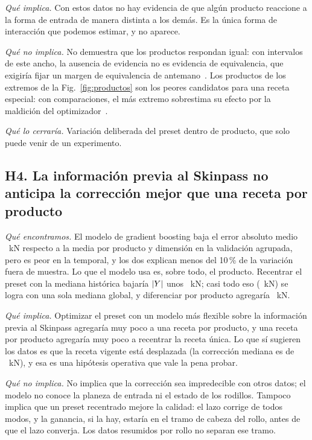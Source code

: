 \emph{Qué implica.} Con estos datos no hay evidencia de que algún producto reaccione a la forma de entrada de manera
distinta a los demás. Es la única forma de interacción que podemos estimar, y no aparece.

\emph{Qué no implica.} No demuestra que los productos respondan igual: con intervalos de este ancho, la ausencia de
evidencia no es evidencia de equivalencia, que exigiría fijar un margen de equivalencia de antemano~\cite{wellek2010}.
Los productos de los extremos de la Fig.~\ref{fig:productos} son los peores candidatos para una receta especial: con
\NProdHet{} comparaciones, el más extremo sobrestima su efecto por la maldición del optimizador~\cite{smith2006}.

\emph{Qué lo cerraría.} Variación deliberada del preset dentro de producto, que solo puede venir de un experimento.

\subsection{H4. La información previa al Skinpass no anticipa la corrección mejor que una receta por producto}
\emph{Qué encontramos.} El modelo de gradient boosting baja el error absoluto medio \PredMAEDifGrupo~kN respecto a la
media por producto y dimensión en la validación agrupada, pero es peor en la temporal, y los dos explican menos del
10\,\% de la variación fuera de muestra. Lo que el modelo usa es, sobre todo, el producto. Recentrar el preset con la
mediana histórica bajaría $|Y|$ unos \ExpDeltaA~kN; casi todo eso (\ExpDeltaGlobal~kN) se logra con una sola mediana
global, y diferenciar por producto agregaría \ExpDeltaDif~kN.

\emph{Qué implica.} Optimizar el preset con un modelo más flexible sobre la información previa al Skinpass agregaría muy
poco a una receta por producto, y una receta por producto agregaría muy poco a recentrar la receta única. Lo que sí
sugieren los datos es que la receta vigente está desplazada (la corrección mediana es de \YMediana~kN), y esa es una
hipótesis operativa que vale la pena probar.

\emph{Qué no implica.} No implica que la corrección sea impredecible con otros datos; el modelo no conoce la planeza de
entrada ni el estado de los rodillos. Tampoco implica que un preset recentrado mejore la calidad: el lazo corrige de
todos modos, y la ganancia, si la hay, estaría en el tramo de cabeza del rollo, antes de que el lazo converja. Los datos
resumidos por rollo no separan ese tramo.

